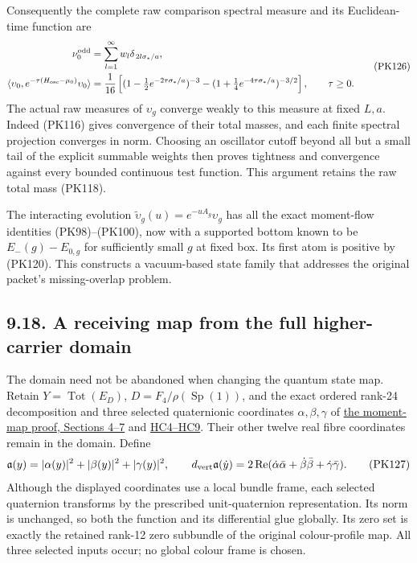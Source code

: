 \documentclass[11pt]{article}
\begin{document}
Consequently the complete raw comparison spectral measure and its
Euclidean-time function are
\[
 \begin{split}
 \nu_0^{\rm odd}
   &=\sum_{l=1}^\infty w_l\delta_{\,2l\sigma_*/a},\\
 \langle\upsilon_0,e^{-\tau(H_{\rm osc}-\mu_0)}\upsilon_0\rangle
   &=\frac1{16}\left[
       (1-\tfrac12e^{-2\tau\sigma_*/a})^{-3}
       -(1+\tfrac14e^{-4\tau\sigma_*/a})^{-3/2}
                \right],\qquad \tau\ge0 .
 \end{split}\tag{PK126}
\]
The actual raw measures of \(\upsilon_g\) converge weakly to this
measure at fixed \(L,a\). Indeed (PK116) gives convergence of their
total masses, and each finite spectral projection converges in norm.
Choosing an oscillator cutoff beyond all but a small tail of the
explicit summable weights then proves tightness and convergence
against every bounded continuous test function. This argument
retains the raw total mass (PK118).

The interacting evolution
\(\widetilde\upsilon_g(u)=e^{-uA_g}\upsilon_g\) has all the exact
moment-flow identities (PK98)–(PK100), now with a supported bottom
known to be \(E_-(g)-E_{0,g}\) for sufficiently small \(g\) at fixed
box. Its first atom is positive by (PK120). This constructs a
vacuum-based state family that addresses the original packet's
missing-overlap problem.

\subsection*{9.18. A receiving map from the full higher-carrier domain}

The domain need not be abandoned when changing the quantum state map.
Retain \(Y=\operatorname{Tot}(E_D)\), \(D=F_4/\rho(\operatorname{Sp}(1))\),
and the exact ordered rank-24 decomposition and three selected
quaternionic coordinates \(\alpha,\beta,\gamma\) of
\href{https://github.com/KokunoYumeto/yang-mills-interacting-workbench/blob/c4a1fd2e34a5d75a5a1b04df4d097f992c345cc7/yang-mills/continuations/20260930-s6-ns-moment-map-bridge/PROOF.md}{the moment-map proof, Sections 4–7}
and \href{https://github.com/KokunoYumeto/yang-mills-interacting-workbench/blob/c4a1fd2e34a5d75a5a1b04df4d097f992c345cc7/yang-mills/continuations/20260930-s6-ns-moment-map-bridge/HIGHER_CARRIER_AND_EVOLUTION.md}{HC4–HC9}.
Their other twelve real fibre coordinates remain in the domain. Define
\[
 \mathfrak a(y)=|\alpha(y)|^2+|\beta(y)|^2+|\gamma(y)|^2,\qquad
 d_{\rm vert}\mathfrak a(\dot y)
 =2\operatorname{Re}
    (\dot\alpha\bar\alpha+\dot\beta\bar\beta+\dot\gamma\bar\gamma).
 \tag{PK127}
\]
Although the displayed coordinates use a local bundle frame, each
selected quaternion transforms by the prescribed unit-quaternion
representation. Its norm is unchanged, so both the function and its
differential glue globally. Its zero set is exactly the retained
rank-12 zero subbundle of the original colour-profile map. All three
selected inputs occur; no global colour frame is chosen.
\end{document}
